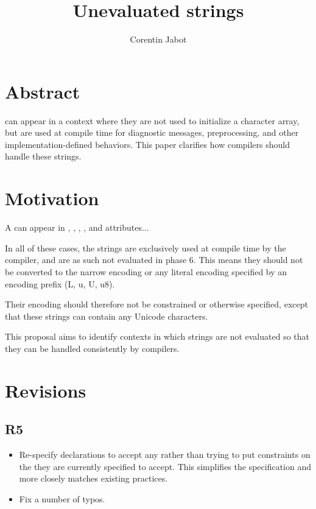 \documentclass{wg21}
\title{Unevaluated strings}
\author{Corentin Jabot}{corentin.jabot@gmail.com}
\begin{document}
\maketitle

\section{Abstract}

 can appear in a context where they are not used to
initialize a character array, but are used at compile time for diagnostic messages,
preprocessing, and other implementation-defined behaviors.
This paper clarifies how compilers should handle these strings.


\section{Motivation}

A  can appear in , , ,
, \tcode{[[deprecated]]} and \tcode{[[nodiscard]]} attributes...

In all of these cases, the strings are exclusively used at compile time by the compiler, and are as such not evaluated in phase 6.
This means they should not be converted to the narrow encoding or any literal encoding specified by an encoding prefix (L, u, U, u8).

Their encoding should therefore not be constrained or otherwise specified,
except that these strings can contain any Unicode characters.

This proposal aims to identify contexts in which strings are not evaluated so that they can be handled consistently by compilers.

\section{Revisions}

\subsection{R5}
\begin{itemize}
\item Re-specify  declarations to accept any  rather than trying to put constraints on the 
 they are currently specified to accept. This simplifies the specification and more closely matches existing practices.
\item Fix a number of typos.
\end{itemize}
\end{document}
